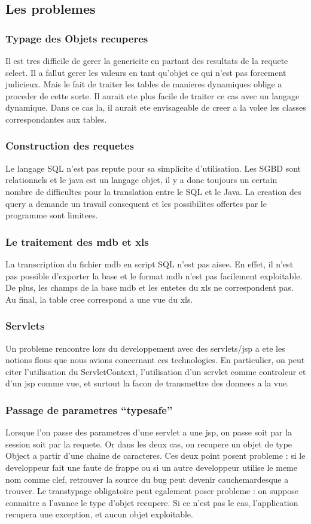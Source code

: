 \subsection{Les problemes}
\subsubsection{Typage des Objets recuperes}
Il est tres difficile de gerer la genericite en partant des resultats de la requete select. Il a fallut gerer les valeurs en tant qu'objet ce qui n'est pas forcement judicieux. Mais le fait de traiter les tables de manieres dynamiques oblige a proceder de cette sorte. Il aurait ete plus facile de traiter ce cas avec un langage dynamique. Dans ce cas la, il aurait ete envisageable de creer a la volee les classes correspondantes aux tables.
\subsubsection{Construction des requetes}
Le langage SQL n'est pas repute pour sa simplicite d'utilisation. Les SGBD sont relationnels et le java est un langage objet, il y a donc toujours un certain nombre de difficultes pour la translation entre le SQL et le Java. La creation des query a demande un travail consequent et les possibilites offertes par le programme sont limitees.
\subsubsection{Le traitement des mdb et xls}
La transcription du fichier mdb en script SQL n'est pas aisee. En effet, il n'est pas possible d'exporter la base et le format mdb n'est pas facilement exploitable. De plus, les champs de la base mdb et les entetes du xls ne correspondent pas. Au final, la table cree correspond a une vue du xls.

\subsubsection{Servlets}
Un probleme rencontre lors du developpement avec des servlets/jsp a ete les notions flous que nous avions concernant ces technologies. En particulier, on peut citer l'utilisation du ServletContext, l'utilisation d'un servlet comme controleur et d'un jsp comme vue, et surtout la facon de transmettre des donnees a la vue.

\subsubsection{Passage de parametres ``typesafe''}
Lorsque l'on passe des parametres d'une servlet a une jsp, on passe soit par la session soit par la requete. Or dans les deux cas, on recupere un objet de type Object a partir d'une chaine de caracteres. Ces deux point posent probleme : si le developpeur fait une faute de frappe ou si un autre developpeur utilise le meme nom comme clef, retrouver la source du bug peut devenir cauchemardesque a trouver. Le transtypage obligatoire peut egalement poser probleme : on suppose connaitre a l'avance le type d'objet recupere. Si ce n'est pas le cas, l'application recupera une exception, et aucun objet exploitable.

